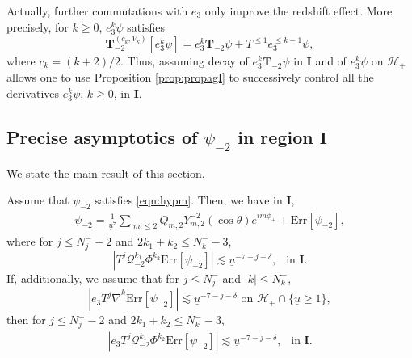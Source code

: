 \documentclass[reqno]{amsart}
\numberwithin{equation}{section}
\newcommand{\mch}{\mathcal{H}}
\newcommand{\mcq}{\mathcal{Q}}
\newcommand{\ubar}{{\underline{u}}}
\newcommand{\errm}{\mathrm{Err}[\Psim]}
\newcommand{\nablabar}{\overline{\nabla}}
\newcommand{\teuk}{\mathbf{T}}
\newcommand{\un}{\mathbf{I}}
\newcommand{\Psim}{\psi_{-2}}
\newcommand{\psim}{\psi_{-2}}
\newcommand{\sfrak}{2}
\newcommand{\ansatzm}{\frac{1}{\ubar^7}\sum_{|m|\leq2}Q_{m,\sfrak}Y_{m,\sfrak}^{-\sfrak}(\cos\theta)e^{im\phi_{+}}}
\theoremstyle{plain}
\theoremstyle{definition}
\theoremstyle{remark}
\numberwithin{equation}{section}
\begin{document}
\begin{rem}
    Actually, further commutations with $e_3$ only improve the redshift effect. More precisely, for $k\geq 0$, $e_3^k\psi$ satisfies
    $$\teuk_{-2}^{(c_k,V_k)}[e_3^k\psi]=e_3^k\teuk_{-2}\psi+T^{\leq 1}e_3^{\leq k-1}\psi,$$
    where $c_k=(k+2)/2$. Thus, assuming decay of $e_3^k\teuk_{-2}\psi$ in $\un$ and of $e_3^k\psi$ on $\mch_+$ allows one to use Proposition \ref{prop:propagI} to successively control all the derivatives $e_3^k\psi$, $k\geq 0$, in $\un$.
\end{rem}

\subsection{Precise asymptotics of $\psi_{-2}$ in region $\mathbf{I}$}\label{subsection:applyI}
We state the main result of this section.
\begin{prop}\label{prop:ansatzI}
    Assume that $\psim$ satisfies \eqref{eqn:hypm}. Then, we have in $\mathbf{I}$,
    \begin{align}\label{eqn:ansatzmI}
        \psim =\ansatzm+\errm,
    \end{align}
where for $j\leq N_j^--2$ and $2k_1+k_2\leq N_k^--3$,
$$|T^j\mcq_{-2}^{k_1}\Phi^{k_2}\errm|\lesssim\ubar^{-7-j-\delta},\:\:\text{ in }\un.$$
If, additionally, we assume that for $j\leq N_j^-$ and $|k|\leq N_k^-$,
$$\left|e_3T^j\nablabar^k\errm\right|\lesssim\ubar^{-7-j-\delta}\text{   on   }\mch_+\cap\{\ubar\geq 1\},$$
then for $j\leq N_j^--2$ and $2k_1+k_2\leq N_k^--3$,
\begin{align}\label{eqn:labeler}
    |e_3T^j\mcq_{-2}^{k_1}\Phi^{k_2}\errm|\lesssim\ubar^{-7-j-\delta},\:\:\text{ in }\un.
\end{align}
\end{prop}
\end{document}
